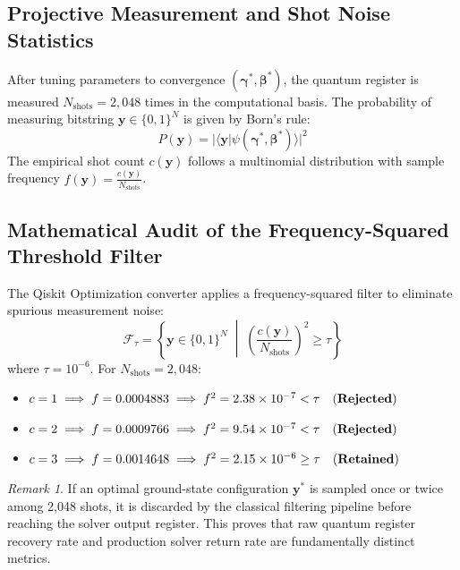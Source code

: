 \documentclass[11pt,a4paper]{article}
\theoremstyle{definition}
\theoremstyle{remark}
\newtheorem{remark}{Remark}
\begin{document}
\subsection{Projective Measurement and Shot Noise Statistics}
After tuning parameters to convergence $(\boldsymbol{\gamma}^*, \boldsymbol{\beta}^*)$, the quantum register is measured $N_{\text{shots}} = 2,048$ times in the computational basis. The probability of measuring bitstring $\mathbf{y} \in \{0, 1\}^N$ is given by Born's rule:
\begin{equation}
P(\mathbf{y}) = |\langle \mathbf{y} | \psi(\boldsymbol{\gamma}^*, \boldsymbol{\beta}^*) \rangle|^2
\end{equation}
The empirical shot count $c(\mathbf{y})$ follows a multinomial distribution with sample frequency $f(\mathbf{y}) = \frac{c(\mathbf{y})}{N_{\text{shots}}}$.

\subsection{Mathematical Audit of the Frequency-Squared Threshold Filter}
The Qiskit Optimization converter applies a frequency-squared filter to eliminate spurious measurement noise:
\begin{equation}
\mathcal{F}_{\tau} = \left\{ \mathbf{y} \in \{0, 1\}^N \;\middle|\; \left( \frac{c(\mathbf{y})}{N_{\text{shots}}} \right)^2 \ge \tau \right\}
\label{eq:filter_rule}
\end{equation}
where $\tau = 10^{-6}$. For $N_{\text{shots}} = 2,048$:
\begin{itemize}
    \item $c = 1 \implies f = 0.0004883 \implies f^2 = 2.38 \times 10^{-7} < \tau \quad \text{(\textbf{Rejected})}$
    \item $c = 2 \implies f = 0.0009766 \implies f^2 = 9.54 \times 10^{-7} < \tau \quad \text{(\textbf{Rejected})}$
    \item $c = 3 \implies f = 0.0014648 \implies f^2 = 2.15 \times 10^{-6} \ge \tau \quad \text{(\textbf{Retained})}$
\end{itemize}
\begin{remark}
If an optimal ground-state configuration $\mathbf{y}^*$ is sampled once or twice among 2,048 shots, it is discarded by the classical filtering pipeline before reaching the solver output register. This proves that raw quantum register recovery rate and production solver return rate are fundamentally distinct metrics.
\end{remark}
\end{document}
